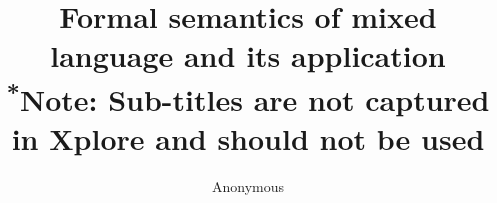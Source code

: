 \documentclass[letterpaper, 10 pt, conference]{IEEEtran}
\begin{document}
\title{Formal semantics of mixed language and its application\\
{\footnotesize \textsuperscript{*}Note: Sub-titles are not captured in Xplore and
should not be used}
}
\author{Anonymous}

\maketitle
\end{document}
